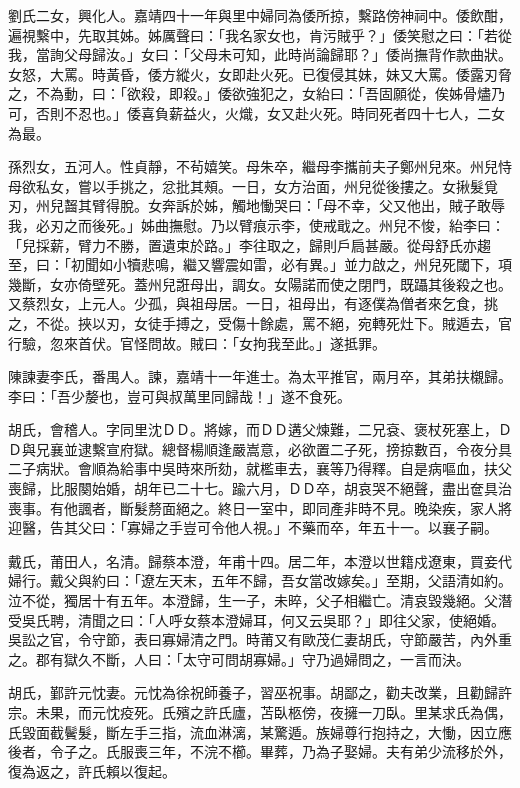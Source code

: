 \begin{pinyinscope}
劉氏二女，興化人。嘉靖四十一年與里中婦同為倭所掠，繫路傍神祠中。倭飲酣，遍視繫中，先取其姊。姊厲聲曰：「我名家女也，肯污賊乎？」倭笑慰之曰：「若從我，當詢父母歸汝。」女曰：「父母未可知，此時尚論歸耶？」倭尚撫背作款曲狀。女怒，大罵。時黃昏，倭方縱火，女即赴火死。已復侵其妹，妹又大罵。倭露刃脅之，不為動，曰：「欲殺，即殺。」倭欲強犯之，女紿曰：「吾固願從，俟姊骨燼乃可，否則不忍也。」倭喜負薪益火，火熾，女又赴火死。時同死者四十七人，二女為最。

孫烈女，五河人。性貞靜，不茍嬉笑。母朱卒，繼母李攜前夫子鄭州兒來。州兒恃母欲私女，嘗以手挑之，忿批其頰。一日，女方治面，州兒從後摟之。女揪髮覓刃，州兒齧其臂得脫。女奔訴於姊，觸地慟哭曰：「母不幸，父又他出，賊子敢辱我，必刃之而後死。」姊曲撫慰。乃以臂痕示李，使戒戢之。州兒不悛，紿李曰：「兒採薪，臂力不勝，置遺束於路。」李往取之，歸則戶扃甚嚴。從母舒氏亦趨至，曰：「初聞如小犢悲鳴，繼又響震如雷，必有異。」並力啟之，州兒死閾下，項幾斷，女亦倚壁死。蓋州兒誑母出，調女。女陽諾而使之閉門，既躡其後殺之也。又蔡烈女，上元人。少孤，與祖母居。一日，祖母出，有逐僕為僧者來乞食，挑之，不從。挾以刃，女徒手搏之，受傷十餘處，罵不絕，宛轉死灶下。賊遁去，官行驗，忽來首伏。官怪問故。賊曰：「女拘我至此。」遂抵罪。

陳諫妻李氏，番禺人。諫，嘉靖十一年進士。為太平推官，兩月卒，其弟扶櫬歸。李曰：「吾少嫠也，豈可與叔萬里同歸哉！」遂不食死。

胡氏，會稽人。字同里沈ＤＤ。將嫁，而ＤＤ遘父煉難，二兄袞、褒杖死塞上，ＤＤ與兄襄並逮繫宣府獄。總督楊順逢嚴嵩意，必欲置二子死，搒掠數百，令夜分具二子病狀。會順為給事中吳時來所劾，就檻車去，襄等乃得釋。自是病嘔血，扶父喪歸，比服闋始婚，胡年已二十七。踰六月，ＤＤ卒，胡哀哭不絕聲，盡出奩具治喪事。有他諷者，斷髮剺面絕之。終日一室中，即同產非時不見。晚染疾，家人將迎醫，告其父曰：「寡婦之手豈可令他人視。」不藥而卒，年五十一。以襄子嗣。

戴氏，莆田人，名清。歸蔡本澄，年甫十四。居二年，本澄以世籍戍遼東，買妾代婦行。戴父與約曰：「遼左天末，五年不歸，吾女當改嫁矣。」至期，父語清如約。泣不從，獨居十有五年。本澄歸，生一子，未晬，父子相繼亡。清哀毀幾絕。父潛受吳氏聘，清聞之曰：「人呼女蔡本澄婦耳，何又云吳耶？」即往父家，使絕婚。吳訟之官，令守節，表曰寡婦清之門。時莆又有歐茂仁妻胡氏，守節嚴苦，內外重之。郡有獄久不斷，人曰：「太守可問胡寡婦。」守乃過婦問之，一言而決。

胡氏，鄞許元忱妻。元忱為徐祝師養子，習巫祝事。胡鄙之，勸夫改業，且勸歸許宗。未果，而元忱疫死。氏殯之許氏廬，苫臥柩傍，夜擁一刀臥。里某求氏為偶，氏毀面截鬢髮，斷左手三指，流血淋漓，某驚遁。族婦尊行抱持之，大慟，因立應後者，令子之。氏服喪三年，不浣不櫛。畢葬，乃為子娶婦。夫有弟少流移於外，復為返之，許氏賴以復起。


\end{pinyinscope}
